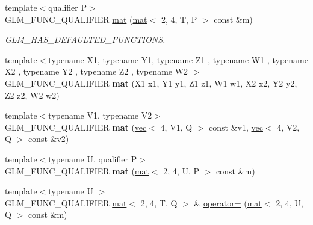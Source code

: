 \begin{DoxyCompactItemize}
{\footnotesize template$<$qualifier P$>$ }\\G\+L\+M\+\_\+\+F\+U\+N\+C\+\_\+\+Q\+U\+A\+L\+I\+F\+I\+ER \hyperlink{structglm_1_1mat_3_012_00_014_00_01T_00_01Q_01_4_ad26e6bdecb751d1e23c03f632cec5d6b}{mat} (\hyperlink{structglm_1_1mat}{mat}$<$ 2, 4, T, P $>$ const \&m)
\begin{DoxyCompactList}\small\item\em G\+L\+M\+\_\+\+H\+A\+S\+\_\+\+D\+E\+F\+A\+U\+L\+T\+E\+D\+\_\+\+F\+U\+N\+C\+T\+I\+O\+NS. \end{DoxyCompactList}\item 
\mbox{\label{structglm_1_1mat_3_012_00_014_00_01T_00_01Q_01_4_a35c313eeda0056abcdbf40fb27a2f2ec}} 
{\footnotesize template$<$typename X1, typename Y1, typename Z1 , typename W1 , typename X2 , typename Y2 , typename Z2 , typename W2 $>$ }\\G\+L\+M\+\_\+\+F\+U\+N\+C\+\_\+\+Q\+U\+A\+L\+I\+F\+I\+ER {\bfseries mat} (X1 x1, Y1 y1, Z1 z1, W1 w1, X2 x2, Y2 y2, Z2 z2, W2 w2)
\item 
\mbox{\label{structglm_1_1mat_3_012_00_014_00_01T_00_01Q_01_4_a375110d1c276ac57082295d2b7784f81}} 
{\footnotesize template$<$typename V1, typename V2$>$ }\\G\+L\+M\+\_\+\+F\+U\+N\+C\+\_\+\+Q\+U\+A\+L\+I\+F\+I\+ER {\bfseries mat} (\hyperlink{structglm_1_1vec}{vec}$<$ 4, V1, Q $>$ const \&v1, \hyperlink{structglm_1_1vec}{vec}$<$ 4, V2, Q $>$ const \&v2)
\item 
\mbox{\label{structglm_1_1mat_3_012_00_014_00_01T_00_01Q_01_4_a6378d044b3734b9408b1061d86fb38dd}} 
{\footnotesize template$<$typename U, qualifier P$>$ }\\G\+L\+M\+\_\+\+F\+U\+N\+C\+\_\+\+Q\+U\+A\+L\+I\+F\+I\+ER {\bfseries mat} (\hyperlink{structglm_1_1mat}{mat}$<$ 2, 4, U, P $>$ const \&m)
\item 
\mbox{\label{structglm_1_1mat_3_012_00_014_00_01T_00_01Q_01_4_a00ea1f4e59b7db6877a93d3295a4eb55}} 
{\footnotesize template$<$typename U $>$ }\\G\+L\+M\+\_\+\+F\+U\+N\+C\+\_\+\+Q\+U\+A\+L\+I\+F\+I\+ER \hyperlink{structglm_1_1mat}{mat}$<$ 2, 4, T, Q $>$ \& \hyperlink{structglm_1_1mat_3_012_00_014_00_01T_00_01Q_01_4_a00ea1f4e59b7db6877a93d3295a4eb55}{operator=} (\hyperlink{structglm_1_1mat}{mat}$<$ 2, 4, U, Q $>$ const \&m)

\end{DoxyCompactItemize}
